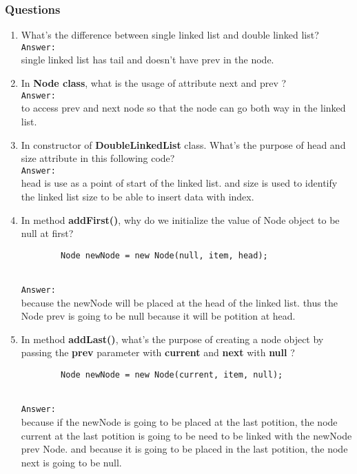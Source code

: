 \documentclass[12pt,titlepage]{article}
\begin{document}
\subsubsection{Questions}
\begin{enumerate}
    \item What’s the difference between single linked list and double linked list?
    \mbox{}\\
    \texttt{Answer: }
    \mbox{}\\
    single linked list has tail and doesn't have prev in the node.
    \item In \textbf{Node class}, what is the usage of attribute next and prev ?
    \mbox{}\\
    \texttt{Answer: }
    \mbox{}\\
    to access prev and next node so that the node can go both way in the linked list.
    \item In constructor of \textbf{DoubleLinkedList} class. What’s the purpose of head and size attribute in this following code?
    \mbox{}\\
    \texttt{Answer: }
    \mbox{}\\
    head is use as a point of start of the linked list. and size is used to identify the linked list size to be able to insert data with index.
    \item In method \textbf{addFirst()}, why do we initialize the value of Node object to be null at first?
    \begin{verbatim}
        Node newNode = new Node(null, item, head);
    \end{verbatim}
    \mbox{}\\
    \texttt{Answer: }
    \mbox{}\\
    because the newNode will be placed at the head of the linked list. thus the Node prev is going to be null because it will be potition at head.
    \item In method \textbf{addLast()}, what’s the purpose of creating a node object by passing the \textbf{prev} parameter with \textbf{current} and \textbf{next} with \textbf{null} ?
    \begin{verbatim}
        Node newNode = new Node(current, item, null);
    \end{verbatim}
    \mbox{}\\
    \texttt{Answer: }
    \mbox{}\\
    because if the newNode is going to be placed at the last potition, the node current at the last potition is going to be need to be linked with the newNode prev Node. and because it is going to be placed in the last potition, the node next is going to be null.
\end{enumerate}
\end{document}
